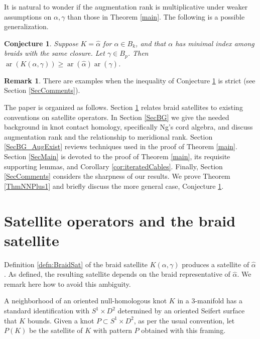 \documentclass[11pt]{amsart}
\def\ar{\operatorname{ar}}
\newtheorem{conj}[thm]{Conjecture}
\theoremstyle{definition}
\newtheorem{rem}[thm]{Remark}
\begin{document}
It is natural to wonder if the augmentation rank is multiplicative under weaker assumptions on $\alpha, \gamma$ than those in Theorem \ref{main}. The following is a possible generalization.

\begin{conj}Suppose $K=\hat{\alpha}$ for $\alpha\in B_k$, and that $\alpha$ has minimal index among braids with the same closure. Let $\gamma\in B_p$. Then $\ar(K(\alpha,\gamma)) \ge \ar(\hat{\alpha})\ar(\hat{\gamma})$.
\label{ConjSuperMultipl}
\end{conj}

\begin{rem}There are examples when the inequality of Conjecture \ref{ConjSuperMultipl} is strict (see Section \ref{SecComments}).
\label{RemStrictlySuper}
\end{rem}

The paper is organized as follows. Section \ref{SecAsSatelliteOp} relates braid satellites to existing conventions on satellite operators. In Section \ref{SecBG} we give the needed background in knot contact homology, specifically Ng's cord algebra, and discuss augmentation rank and the relationship to meridional rank. Section \ref{SecBG_AugExist} reviews techniques used in the proof of Theorem \ref{main}. Section \ref{SecMain} is devoted to the proof of Theorem \ref{main}, its requisite supporting lemmas, and Corollary \ref{cor:iteratedCables}. Finally, Section \ref{SecComments} considers the sharpness of our results. We prove Theorem \ref{ThmNNPlus1} and briefly discuss the more general case, Conjecture \ref{ConjSuperMultipl}.


\section{Satellite operators and the braid satellite}
\label{SecAsSatelliteOp}

Definition \ref{defn:BraidSat} of the braid satellite $K(\alpha,\gamma)$ produces a satellite of $\hat{\alpha}$. As defined, the resulting satellite depends on the braid representative of $\hat{\alpha}$. We remark here how to avoid this ambiguity.

A neighborhood of an oriented null-homologous knot $K$ in a 3-manifold has a standard identification with $S^1\times D^2$ determined by an oriented Seifert surface that $K$ bounds. Given a knot $P\subset S^1\times D^2$, as per the usual convention, let $P(K)$ be the satellite of $K$ with pattern $P$ obtained with this framing.
\end{document}
